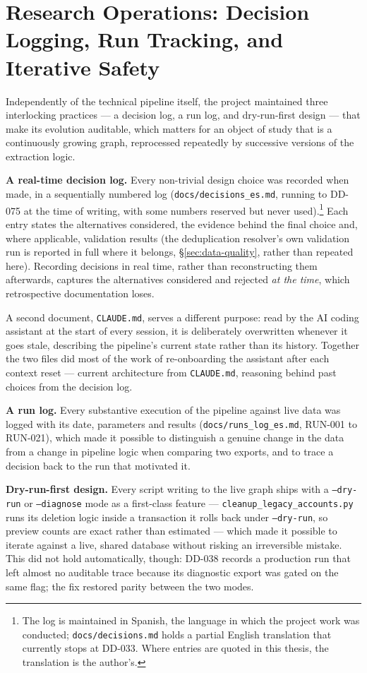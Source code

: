 \documentclass[12pt, a4paper]{report}
\begin{document}
\section{Research Operations: Decision Logging, Run Tracking, and Iterative Safety}
\label{sec:research-ops}

Independently of the technical pipeline itself, the project maintained
three interlocking practices — a decision log, a run log, and
dry-run-first design — that make its evolution auditable, which matters
for an object of study that is a continuously growing graph, reprocessed
repeatedly by successive versions of the extraction logic.

\textbf{A real-time decision log.} Every non-trivial design choice was
recorded when made, in a sequentially numbered log
(\texttt{docs/decisions\_es.md}, running to DD-075 at the time of
writing, with some numbers reserved but never used).\footnote{The log
is maintained in Spanish, the language in which the project work was
conducted; \texttt{docs/decisions.md} holds a partial English
translation that currently stops at DD-033. Where entries are quoted in
this thesis, the translation is the author's.}
Each entry states the alternatives considered, the evidence behind the
final choice and, where applicable, validation results (the
deduplication resolver's own validation run is reported in full where it
belongs, \S\ref{sec:data-quality}, rather than repeated here). Recording
decisions in real time, rather than reconstructing them afterwards,
captures the alternatives considered and rejected \emph{at the time},
which retrospective documentation loses.

A second document, \texttt{CLAUDE.md}, serves a different purpose: read
by the AI coding assistant at the start of every session, it is
deliberately overwritten whenever it goes stale, describing the
pipeline's current state rather than its history. Together the two files
did most of the work of re-onboarding the assistant after each context
reset — current architecture from \texttt{CLAUDE.md}, reasoning behind
past choices from the decision log.

\textbf{A run log.} Every substantive execution of the pipeline against
live data was logged with its date, parameters and results
(\texttt{docs/runs\_log\_es.md}, RUN-001 to RUN-021), which made it
possible to distinguish a genuine change in the data from a change in
pipeline logic when comparing two exports, and to trace a decision back
to the run that motivated it.

\textbf{Dry-run-first design.} Every script writing to the live graph
ships with a \texttt{--dry-run} or \texttt{--diagnose} mode as a
first-class feature — \texttt{cleanup\_legacy\_accounts.py} runs its
deletion logic inside a transaction it rolls back under
\texttt{--dry-run}, so preview counts are exact rather than estimated —
which made it possible to iterate against a live, shared database
without risking an irreversible mistake. This did not hold
automatically, though: DD-038 records a production run that left almost
no auditable trace because its diagnostic export was gated on the same
flag; the fix restored parity between the two modes.
\end{document}
